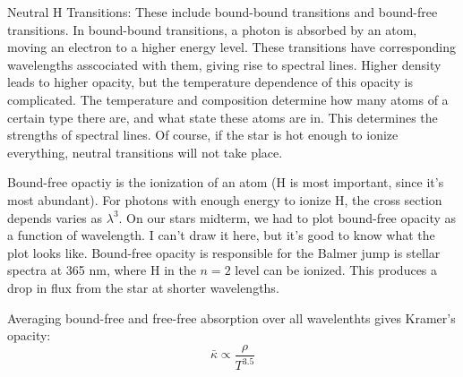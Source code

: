 \begin{enumerate}
      Neutral H Transitions:
      These include bound-bound transitions and bound-free transitions.  In bound-bound 
      transitions, a photon is absorbed by an atom, moving an electron to a higher energy level.  
      These transitions have corresponding wavelengths asscociated with them, giving rise 
      to spectral lines.  Higher density leads to higher opacity, but the temperature 
      dependence of this opacity is complicated.  The temperature and composition determine 
      how many atoms of a certain type there are, and what state these atoms are in.  This 
      determines the strengths of spectral lines.  Of course, if the star is hot enough to 
      ionize everything, neutral transitions will not take place.
      
      Bound-free opactiy is the ionization of an atom (H is most important, since it's most 
      abundant).  For photons with enough energy to ionize H, the cross section depends varies 
      as $\lambda^3$.  On our stars midterm, we had to plot bound-free opacity as a function of 
      wavelength.  I can't draw it here, but it's good to know what the plot looks like.  
      Bound-free opacity is responsible for the Balmer jump is stellar spectra at 365 nm, where 
      H in the $n=2$ level can be ionized.  This produces a drop in flux from the star at shorter 
      wavelengths.

      Averaging bound-free and free-free absorption over all wavelenthts gives Kramer's opacity:
      \begin{equation}
      \bar{\kappa}\propto \frac{\rho}{T^{3.5}}
      \end{equation}
       
\end{enumerate}

